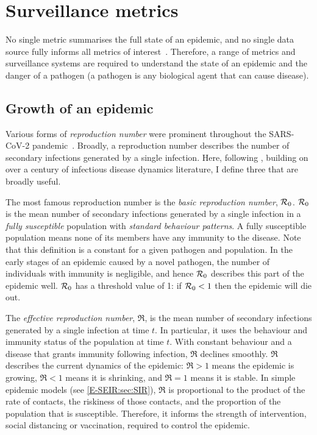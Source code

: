 \documentclass[thesis.tex]{subfiles}
\begin{document}
\section{Surveillance metrics}

No single metric summarises the full state of an epidemic, and no single data source fully informs all metrics of interest~\autocite{royalSocietyRnumber,pellisEstimation,paragGrowthRates}.
Therefore, a range of metrics and surveillance systems are required to understand the state of an epidemic and the danger of a pathogen (a pathogen is any biological agent that can cause disease).

\subsection{Growth of an epidemic}

Various forms of \emph{reproduction number} were prominent throughout the SARS-CoV-2 pandemic~\autocite{pellisEstimation}.
Broadly, a reproduction number describes the number of secondary infections generated by a single infection.
Here, following \textcite{pellisEstimation},  building on over a century of infectious disease dynamics literature, I define three that are broadly useful.

The most famous reproduction number is the \emph{basic reproduction number}, $\mathcal{R}_{0}$.
$\mathcal{R}_{0}$ is the mean number of secondary infections generated by a single infection in a \emph{fully susceptible} population with \emph{standard behaviour patterns}.
A fully susceptible population means none of its members have any immunity to the disease.
Note that this definition is a constant for a given pathogen and population.
In the early stages of an epidemic caused by a novel pathogen, the number of individuals with immunity is negligible, and hence $\mathcal{R}_{0}$ describes this part of the epidemic well.
$\mathcal{R}_{0}$ has a threshold value of 1: if $\mathcal{R}_{0} < 1$ then the epidemic will die out.

The \emph{effective reproduction number}, $\Re$, is the mean number of secondary infections generated by a single infection at time $t$.
In particular, it uses the behaviour and immunity status of the population at time $t$.
With constant behaviour and a disease that grants immunity following infection, $\Re$ declines smoothly.
$\Re$ describes the current dynamics of the epidemic: $\Re > 1$ means the epidemic is growing, $\Re < 1$ means it is shrinking, and $\Re = 1$ means it is stable.
In simple epidemic models (see \cref{E-SEIR:sec:SIR}), $\Re$ is proportional to the product of the rate of contacts, the riskiness of those contacts, and the proportion of the population that is susceptible.
Therefore, it informs the strength of intervention, \eg social distancing or vaccination, required to control the epidemic.
\end{document}
